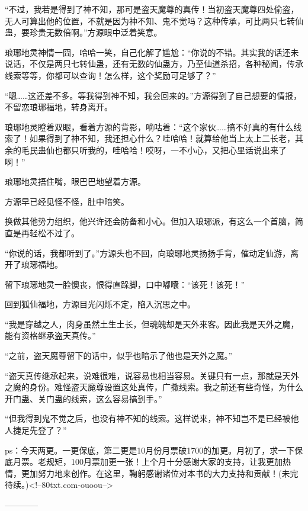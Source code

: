 \begin{this_body}
“不过，我若是得到了神不知，那可是盗天魔尊的真传！当初盗天魔尊四处偷盗，无人可算出他的位置，不就是因为神不知、鬼不觉吗？这种传承，可比两只七转仙蛊，要珍贵无数倍啊。”方源眼中泛着笑意。

琅琊地灵神情一囧，哈哈一笑，自己化解了尴尬：“你说的不错。其实我的话还未说话，不仅是两只七转仙蛊，还有无数的仙蛊方，乃至仙道杀招，各种秘闻，传承线索等等，你都可以查询！怎么样，这个奖励可足够了？”

“嗯……这还差不多。等我得到神不知，我会回来的。”方源得到了自己想要的情报，不留恋琅琊福地，转身离开。

琅琊地灵瞪着双眼，看着方源的背影，嘀咕着：“这个家伙……搞不好真的有什么线索了！如果得到了神不知，我还担心什么？哇哈哈！就算给他当上太上二长老，其余的毛民蛊仙也都只听我的，哇哈哈！哎呀，一不小心，又把心里话说出来了啊！”

琅琊地灵捂住嘴，眼巴巴地望着方源。

方源早已经见怪不怪，肚中暗笑。

换做其他势力组织，他兴许还会防备和小心。但加入琅琊派，有这么一个首脑，简直是再轻松不过了。

“你说的话，我都听到了。”方源头也不回，向琅琊地灵扬扬手背，催动定仙游，离开了琅琊福地。

留下琅琊地灵一脸懊丧，恨得直跺脚，口中嘟囔：“该死！该死！”

回到狐仙福地，方源目光闪烁不定，陷入沉思之中。

“我是穿越之人，肉身虽然土生土长，但魂魄却是天外来客。因此我是天外之魔，能有资格继承盗天真传。”

“之前，盗天魔尊留下的话中，似乎也暗示了他也是天外之魔。”

“盗天真传继承起来，说难很难，说容易也相当容易。关键只有一点，那就是天外之魔的身份。难怪盗天魔尊设置这处真传，广撒线索。我之前还有些奇怪，为什么开门蛊、关门蛊的线索，这么容易搞到手。”

“但我得到鬼不觉之后，也没有神不知的线索。这样说来，神不知岂不是已经被他人捷足先登了？”

ps：今天两更。一更保底，第二更是10月份月票破1700的加更。月初了，求一下保底月票。老规矩，100月票加更一张！上个月十分感谢大家的支持，让我更加热情，更加努力地来创作。在这里，鞠躬感谢诸位对本书的大力支持和贡献！(未完待续。)<!--80txt.com-ouoou-->

------------

\end{this_body}

